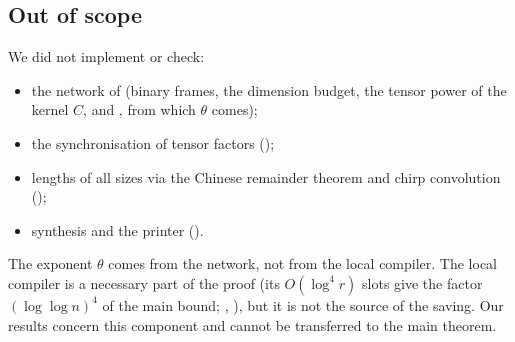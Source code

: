 \documentclass[11pt]{article}
\theoremstyle{plain}
\begin{document}
\subsection{Out of scope}
We did not implement or check:
\begin{itemize}
\item the network of  (binary frames, the dimension budget, the tensor power of the kernel $C$, and , from which $\theta$ comes);
\item the synchronisation of tensor factors ();
\item lengths of all sizes via the Chinese remainder theorem and chirp convolution ();
\item synthesis and the printer ().
\end{itemize}
The exponent $\theta$ comes from the network, not from the local compiler. The local compiler is a necessary part of the proof (its $O(\log^4 r)$ slots give the factor $(\log\log n)^4$ of the main bound; , ), but it is not the source of the saving. Our results concern this component and cannot be transferred to the main theorem.
\end{document}
